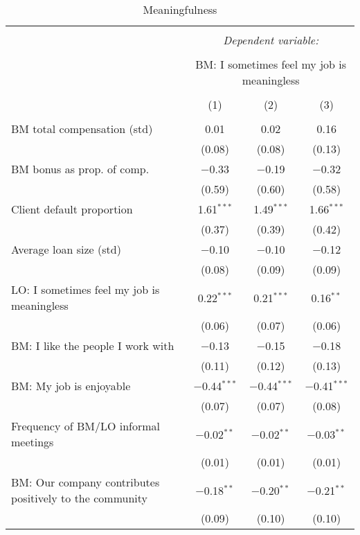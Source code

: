 \documentclass[11pt]{article}
\begin{document}
\begin{table}[!htbp] \centering 
  \caption{Meaningfulness} 
  \label{} 
\footnotesize 
\begin{tabular}{@{\extracolsep{5pt}}lccc} 
\\[-1.8ex]\hline 
\hline \\[-1.8ex] 
 & \multicolumn{3}{c}{\textit{Dependent variable:}} \\ 
\cline{2-4} 
\\[-1.8ex] & \multicolumn{3}{c}{BM: I sometimes feel my job is meaningless} \\ 
\\[-1.8ex] & (1) & (2) & (3)\\ 
\hline \\[-1.8ex] 
 BM total compensation (std) & 0.01 & 0.02 & 0.16 \\ 
  & (0.08) & (0.08) & (0.13) \\ 
  BM bonus as prop. of comp. & $-$0.33 & $-$0.19 & $-$0.32 \\ 
  & (0.59) & (0.60) & (0.58) \\ 
  Client default proportion & 1.61$^{***}$ & 1.49$^{***}$ & 1.66$^{***}$ \\ 
  & (0.37) & (0.39) & (0.42) \\ 
  Average loan size (std) & $-$0.10 & $-$0.10 & $-$0.12 \\ 
  & (0.08) & (0.09) & (0.09) \\ 
  LO: I sometimes feel my job is meaningless & 0.22$^{***}$ & 0.21$^{***}$ & 0.16$^{**}$ \\ 
  & (0.06) & (0.07) & (0.06) \\ 
  BM: I like the people I work with & $-$0.13 & $-$0.15 & $-$0.18 \\ 
  & (0.11) & (0.12) & (0.13) \\ 
  BM: My job is enjoyable & $-$0.44$^{***}$ & $-$0.44$^{***}$ & $-$0.41$^{***}$ \\ 
  & (0.07) & (0.07) & (0.08) \\ 
  Frequency of BM/LO informal meetings & $-$0.02$^{**}$ & $-$0.02$^{**}$ & $-$0.03$^{**}$ \\ 
  & (0.01) & (0.01) & (0.01) \\ 
  BM: Our company contributes positively to the community & $-$0.18$^{**}$ & $-$0.20$^{**}$ & $-$0.21$^{**}$ \\ 
  & (0.09) & (0.10) & (0.10) \\ 

\end{tabular}
\end{table}
\end{document}
